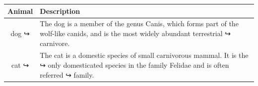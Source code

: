 \documentclass{article}
\begin{document}
 \begin{tabular}{cp{9cm}}
 \toprule
 Animal & Description \\
 \midrule
 dog
 ↪
 & The dog is a member of the genus Canis, which forms
 part of the
 wolf-like canids, and is the most widely abundant
 terrestrial
 ↪
 carnivore. \\
 \addlinespace
 cat
 ↪
 & The cat is a domestic species of small carnivorous
 mammal. It is the
 ↪
 only domesticated species in the family Felidae and
 is often referred
 ↪
 family. \\
 \bottomrule
 \end{tabular}
 
\end{document}
